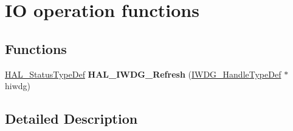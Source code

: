 \hypertarget{group___i_w_d_g___exported___functions___group2}{}\section{IO operation functions}
\label{group___i_w_d_g___exported___functions___group2}
\subsection*{Functions}
\begin{DoxyCompactItemize}
\item 
\mbox{\label{group___i_w_d_g___exported___functions___group2_ga7e86236aea6d2f3638397fdf90333e4a}} 
\hyperlink{stm32f0xx__hal__def_8h_a63c0679d1cb8b8c684fbb0632743478f}{H\+A\+L\+\_\+\+Status\+Type\+Def} {\bfseries H\+A\+L\+\_\+\+I\+W\+D\+G\+\_\+\+Refresh} (\hyperlink{struct_i_w_d_g___handle_type_def}{I\+W\+D\+G\+\_\+\+Handle\+Type\+Def} $\ast$hiwdg)
\end{DoxyCompactItemize}


\subsection{Detailed Description}
